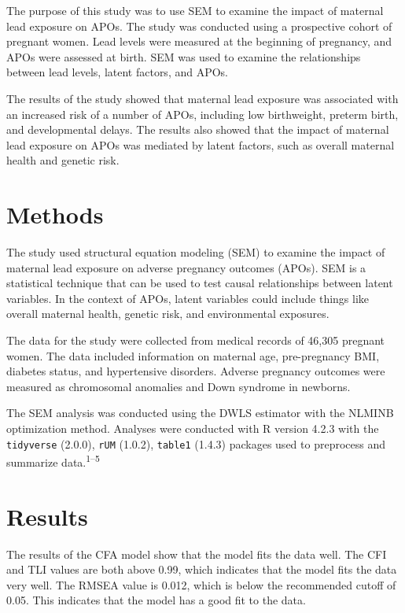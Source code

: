 \documentclass[
  letterpaper,
  DIV=11,
  numbers=noendperiod]{scrartcl}
\begin{document}
The purpose of this study was to use SEM to examine the impact of
maternal lead exposure on APOs. The study was conducted using a
prospective cohort of pregnant women. Lead levels were measured at the
beginning of pregnancy, and APOs were assessed at birth. SEM was used to
examine the relationships between lead levels, latent factors, and APOs.

The results of the study showed that maternal lead exposure was
associated with an increased risk of a number of APOs, including low
birthweight, preterm birth, and developmental delays. The results also
showed that the impact of maternal lead exposure on APOs was mediated by
latent factors, such as overall maternal health and genetic risk.

\hypertarget{methods}{%
\section{Methods}\label{methods}}

The study used structural equation modeling (SEM) to examine the impact
of maternal lead exposure on adverse pregnancy outcomes (APOs). SEM is a
statistical technique that can be used to test causal relationships
between latent variables. In the context of APOs, latent variables could
include things like overall maternal health, genetic risk, and
environmental exposures.

The data for the study were collected from medical records of 46,305
pregnant women. The data included information on maternal age,
pre-pregnancy BMI, diabetes status, and hypertensive disorders. Adverse
pregnancy outcomes were measured as chromosomal anomalies and Down
syndrome in newborns.

The SEM analysis was conducted using the DWLS estimator with the NLMINB
optimization method. Analyses were conducted with R version 4.2.3 with
the \texttt{tidyverse} (2.0.0), \texttt{rUM} (1.0.2), \texttt{table1}
(1.4.3) packages used to preprocess and summarize
data.\textsuperscript{1--5}

\hypertarget{results}{%
\section{Results}\label{results}}

The results of the CFA model show that the model fits the data well. The
CFI and TLI values are both above 0.99, which indicates that the model
fits the data very well. The RMSEA value is 0.012, which is below the
recommended cutoff of 0.05. This indicates that the model has a good fit
to the data.
\end{document}
